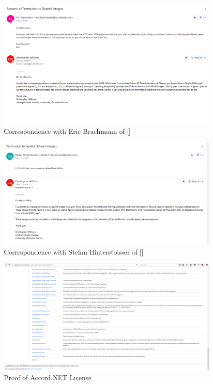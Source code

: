 \documentclass[12pt]{article}
\begin{document}
\begin{figure}
\centering
\includegraphics{Pictures/brachmannPermission.png}
\caption{Correspondence with Eric Brachmann of {[}{]}}
\end{figure}

\begin{figure}
\centering
\includegraphics{Pictures/hinterstoisserPermission.png}
\caption{Correspondence with Stefan Hinterstoisser of {[}{]}}
\end{figure}

\begin{figure}
\centering
\includegraphics{Pictures/accordLicense.png}
\caption{Proof of Accord.NET License}
\end{figure}
\end{document}
